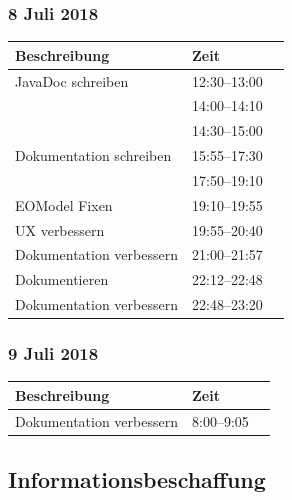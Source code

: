 \documentclass[a4paper, 11pt]{article}
\begin{document}
\subsubsection{8 Juli 2018}

\begin{tabular}{llr}
\toprule
Beschreibung & Zeit \\
\midrule
JavaDoc schreiben & 12:30--13:00 \\
 & 14:00--14:10 \\
 & 14:30--15:00\\
Dokumentation schreiben & 15:55--17:30 \\
 & 17:50--19:10 \\
EOModel Fixen & 19:10--19:55 \\
UX verbessern & 19:55--20:40 \\
Dokumentation verbessern & 21:00--21:57 \\
Dokumentieren & 22:12--22:48 \\
Dokumentation verbessern & 22:48--23:20 \\
\bottomrule
\end{tabular}

\subsubsection{9 Juli 2018}

\begin{tabular}{llr}
\toprule
Beschreibung & Zeit \\
\midrule
Dokumentation verbessern & 8:00--9:05 \\
\bottomrule
\end{tabular}

\subsection{Informationsbeschaffung}
\end{document}
